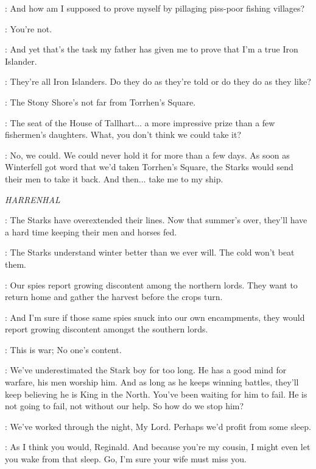 \THEON: And how am I supposed to prove myself by pillaging piss-poor fishing villages? 

\DAGMER: You're not. 

\THEON: And yet that's the task my father has given me to prove that I'm a true Iron Islander. 

\DAGMER: They're all Iron Islanders. Do they do as they're told or do they do as they like? 

\THEON: The Stony Shore's not far from Torrhen's Square. 

\DAGMER: The seat of the House of Tallhart$\ldots$ a more impressive prize than a few fishermen's daughters. What, you don't think we could take it? 

\THEON: No, we could. We could never hold it for more than a few days. As soon as Winterfell got word that we'd taken Torrhen's Square, the Starks would send their men to take it back. And then$\ldots$ take me to my ship. 


\scene

\textit{HARRENHAL} 


\REGINALD: The Starks have overextended their lines. Now that summer's over, they'll have a hard time keeping their men and horses fed. 

\TYWIN: The Starks understand winter better than we ever will. The cold won't beat them. 

\AMORY: Our spies report growing discontent among the northern lords. They want to return home and gather the harvest before the crops turn. 

\TYWIN: And I'm sure if those same spies snuck into our own encampments, they would report growing discontent amongst the southern lords. 

\REGINALD: This is war; No one's content. 

\TYWIN: We've underestimated the Stark boy for too long. He has a good mind for warfare, his men worship him. And as long as he keeps winning battles, they'll keep believing he is King in the North. You've been waiting for him to fail. He is not going to fail, not without our help. So how do we stop him? 

\REGINALD: We've worked through the night, My Lord. Perhaps we'd profit from some sleep. 

\TYWIN: As I think you would, Reginald. And because you're my cousin, I might even let you wake from that sleep. Go, I'm sure your wife must miss you. 

